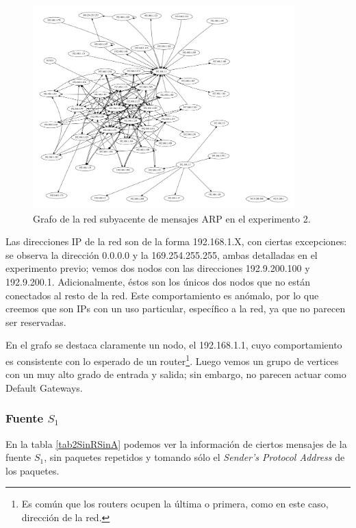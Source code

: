 \begin{figure}[ht]
    \centering
    \includegraphics[width=0.9\textwidth]{figuras/laburo_grafo.pdf}
    \caption{Grafo de la red subyacente de mensajes ARP en el experimento 2.}\label{ARPlaburo}
\end{figure}

\par Las direcciones IP de la red son de la forma 192.168.1.X, con ciertas excepciones: se observa la dirección 0.0.0.0 y la 169.254.255.255, ambas detalladas en el experimento previo; vemos dos nodos con las direcciones 192.9.200.100 y 192.9.200.1.
Adicionalmente, éstos son los únicos dos nodos que no están conectados al resto de la red.
Este comportamiento es anómalo, por lo que creemos que son IPs con un uso particular, específico a la red, ya que no parecen ser reservadas.

\par En el grafo se destaca claramente un nodo, el 192.168.1.1, cuyo comportamiento es consistente con lo esperado de un router\footnote{Es común que los routers ocupen la última o primera, como en este caso, dirección de la red.}.
Luego vemos un grupo de vertices con un muy alto grado de entrada y salida; sin embargo, no parecen actuar como Default Gateways.

\subsubsection{Fuente $S_1$}

\par En la tabla \ref{tab2SinRSinA} podemos ver la información de ciertos mensajes de la fuente $S_1$, sin paquetes repetidos y tomando sólo el \textit{Sender's Protocol Address} de los paquetes.

